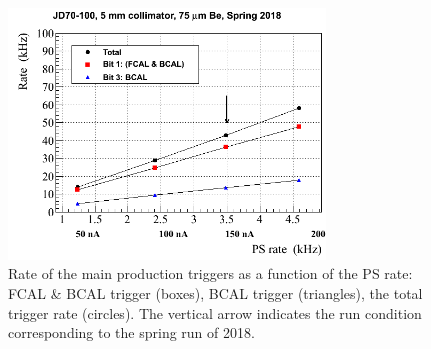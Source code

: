
\begin{figure}[tbp]
\begin{center}
\includegraphics[width=0.75\textwidth]{figures/Rate_diamond_2018.png}  
\caption{Rate of the main production triggers as a function of the PS rate: FCAL \& BCAL trigger (boxes), BCAL trigger (triangles), the total trigger rate (circles). The vertical arrow indicates the run condition corresponding to the spring run of 2018.} \label{fig:trig_rate}
\end{center}
\end{figure}

